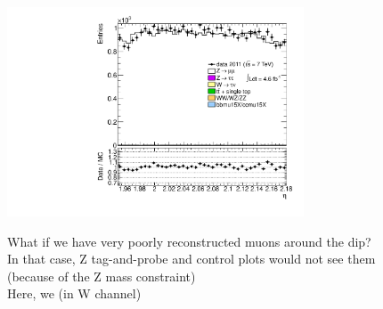 {\includegraphics[width=0.66\textwidth]{dates/20130306/figures/etaphi/Zidms_10_A_stack_lN_eta_ALL.pdf} 
\cole
}

 {
What if we have very poorly reconstructed muons around the dip? \\
In that case, Z tag-and-probe and control plots would not see them \\
(because of the Z mass constraint) \\
Here, we  (in W channel)
}
